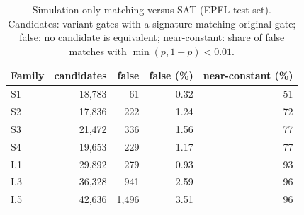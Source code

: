 \begin{table}[h]
\centering
\caption{Simulation-only matching versus SAT (EPFL test set). Candidates: variant gates with a signature-matching original gate; false: no candidate is equivalent; near-constant: share of false matches with $\min(p,1-p)<0.01$.}
\label{tab:app_false}
\small
\begin{tabular}{lrrrr}
\toprule
Family & candidates & false & false (\%) & near-constant (\%) \\
\midrule
S1 & 18,783 & 61 & 0.32 & 51 \\
S2 & 17,836 & 222 & 1.24 & 72 \\
S3 & 21,472 & 336 & 1.56 & 77 \\
S4 & 19,653 & 229 & 1.17 & 77 \\
I.1 & 29,892 & 279 & 0.93 & 93 \\
I.3 & 36,328 & 941 & 2.59 & 96 \\
I.5 & 42,636 & 1,496 & 3.51 & 96 \\
\bottomrule
\end{tabular}
\end{table}
